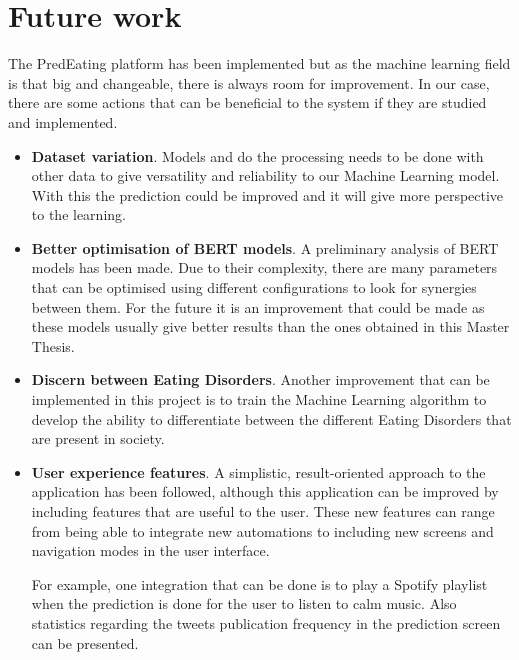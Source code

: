 \section{Future work}
The PredEating platform has been implemented but as the machine learning field is that big and changeable, there is always room for improvement. In our case, there are some actions that can be beneficial to the system if they are studied and implemented.
\begin{itemize}
    \item \textbf{Dataset variation}. Models and do the processing needs to be done with other data to give versatility and reliability to our Machine Learning model. With this the prediction could be improved and it will give more perspective to the learning.
    \item \textbf{Better optimisation of BERT models}. A preliminary analysis of BERT models has been made. Due to their complexity, there are many parameters that can be optimised using different configurations to look for synergies between them. For the future it is an improvement that could be made as these models usually give better results than the ones obtained in this Master Thesis.
    \item \textbf{Discern between Eating Disorders}. Another improvement that can be implemented in this project is to train the Machine Learning algorithm to develop the ability to differentiate between the different Eating Disorders that are present in society.
    \item \textbf{User experience features}. A simplistic, result-oriented approach to the application has been followed, although this application can be improved by including features that are useful to the user. These new features can range from being able to integrate new automations to including new screens and navigation modes in the user interface. 
    
    For example, one integration that can be done is to play a Spotify playlist when the prediction is done for the user to listen to calm music. Also statistics regarding the tweets publication frequency in the prediction screen can be presented.
\end{itemize}

